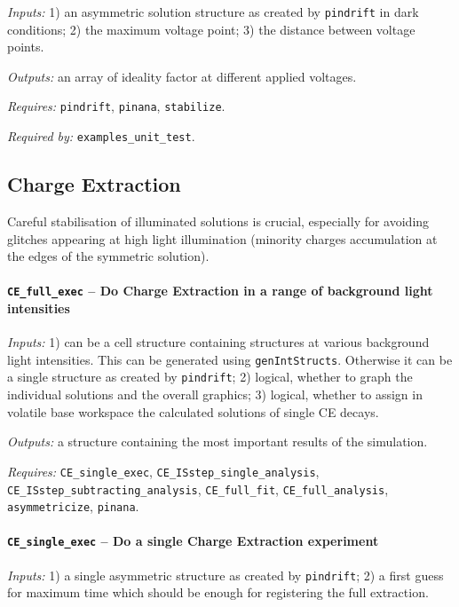 		\textit{Inputs:} 1) an asymmetric solution structure as created by \texttt{pin\-drift} in dark conditions;
		2) the maximum voltage point;
		3) the distance between voltage points.

		\textit{Outputs:} an array of ideality factor at different applied voltages.

		\textit{Requires:} \texttt{pin\-drift}, \texttt{pinana}, \texttt{stabilize}.

		\textit{Required by:} \texttt{examples\_unit\_test}.


	\subsection{Charge Extraction}\label{dd_ce}
		Careful stabilisation of illuminated solutions is crucial, especially for avoiding glitches appearing at high light illumination (minority charges accumulation at the edges of the symmetric solution).

		\paragraph{\texttt{CE\_full\_exec} -- Do Charge Extraction in a range of background light intensities}

		\textit{Inputs:} 1) can be a cell structure containing structures at various background light intensities.
		This can be generated using \texttt{gen\-Int\-Structs}.
		Otherwise it can be a single structure as created by \texttt{pin\-drift};
		2) logical, whether to graph the individual solutions and
		the overall graphics;
		3) logical, whether to assign in volatile base
		workspace the calculated solutions of single CE decays.

		\textit{Outputs:} a structure containing the most important results of the simulation.

		\textit{Requires:} \texttt{CE\_single\_exec}, \texttt{CE\_ISstep\_single\_analysis},   \texttt{CE\_ISstep\_subtracting\_analysis}, \texttt{CE\_full\_fit}, \texttt{CE\_full\_analysis},  \texttt{asymmetricize}, \texttt{pinana}.



		\paragraph{\texttt{CE\_single\_exec} -- Do a single Charge Extraction experiment}

		\textit{Inputs:} 1) a single asymmetric structure as created by \texttt{pin\-drift};
		2) a first guess for maximum time which should be enough for registering the full extraction.

